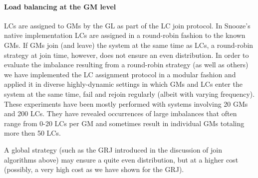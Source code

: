 \paragraph{Load balancing at the GM level} 

LCs are assigned to GMs by the GL as part of the LC join protocol. In
Snooze's native implementation LCs are assigned in a round-robin
fashion to the known GMs. If GMs join (and leave) the system at the
same time as LCs, a round-robin strategy at join time, however, does
not ensure an even distribution. In order to evaluate the imbalance
resulting from a round-robin strategy (as well as others) we have
implemented the LC assignment protocol in a modular fashion and
applied it in diverse highly-dynamic settings in which GMs and LCs
enter the system at the same time, fail and rejoin regularly (albeit
with varying frequency). These experiments have been mostly performed
with systems involving 20 GMs and 200 LCs. They have revealed
occurrences of large imbalances that often range from 0-20 LCs per GM
and sometimes result in individual GMs totaling more then 50 LCs.

A global strategy (such as the GRJ introduced in the discussion of
join algorithms above) may ensure a quite even distribution, but at a
higher cost (possibly, a very high cost as we have shown for the GRJ).




